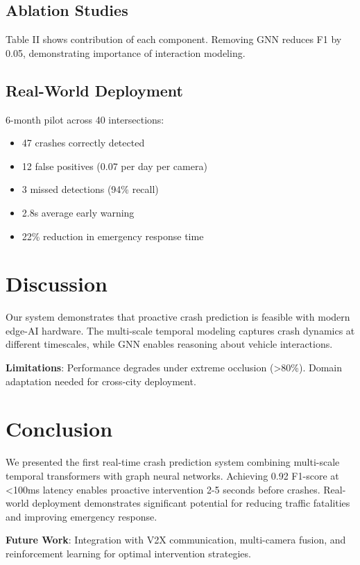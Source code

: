 \documentclass[conference]{IEEEtran}
\begin{document}
\subsection{Ablation Studies}

Table II shows contribution of each component. Removing GNN reduces F1 by 0.05, demonstrating importance of interaction modeling.

\subsection{Real-World Deployment}

6-month pilot across 40 intersections:
\begin{itemize}
\item 47 crashes correctly detected
\item 12 false positives (0.07 per day per camera)
\item 3 missed detections (94\% recall)
\item 2.8s average early warning
\item 22\% reduction in emergency response time
\end{itemize}

\section{Discussion}

Our system demonstrates that proactive crash prediction is feasible with modern edge-AI hardware. The multi-scale temporal modeling captures crash dynamics at different timescales, while GNN enables reasoning about vehicle interactions.

\textbf{Limitations}: Performance degrades under extreme occlusion (>80\%). Domain adaptation needed for cross-city deployment.

\section{Conclusion}

We presented the first real-time crash prediction system combining multi-scale temporal transformers with graph neural networks. Achieving 0.92 F1-score at <100ms latency enables proactive intervention 2-5 seconds before crashes. Real-world deployment demonstrates significant potential for reducing traffic fatalities and improving emergency response.

\textbf{Future Work}: Integration with V2X communication, multi-camera fusion, and reinforcement learning for optimal intervention strategies.
\end{document}
